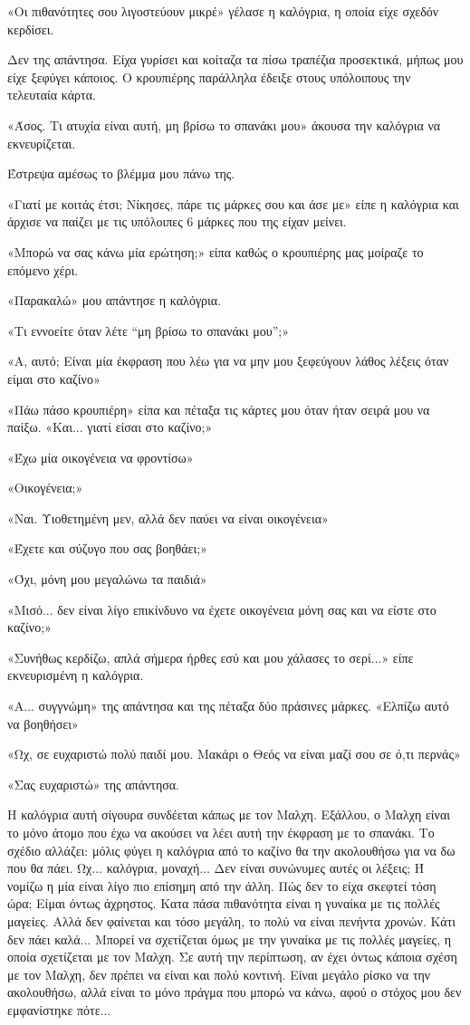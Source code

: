 \documentclass[12pt,twoside, openany]{book}
\begin{document}
«Οι πιθανότητες σου λιγοστεύουν μικρέ» γέλασε η καλόγρια, η οποία είχε σχεδόν κερδίσει.

Δεν της απάντησα. Είχα γυρίσει και κοίταζα τα πίσω τραπέζια προσεκτικά, μήπως μου είχε ξεφύγει κάποιος. Ο κρουπιέρης παράλληλα έδειξε στους υπόλοιπους την τελευταία κάρτα.

«Άσος. Τι ατυχία είναι αυτή, μη βρίσω το σπανάκι μου» άκουσα την καλόγρια να εκνευρίζεται.

Έστρεψα αμέσως το βλέμμα μου πάνω της.

«Γιατί με κοιτάς έτσι; Νίκησες, πάρε τις μάρκες σου και άσε με» είπε η καλόγρια και άρχισε να παίζει με τις υπόλοιπες 6 μάρκες που της είχαν μείνει.

«Μπορώ να σας κάνω μία ερώτηση;» είπα καθώς ο κρουπιέρης μας μοίραζε το επόμενο χέρι.

«Παρακαλώ» μου απάντησε η καλόγρια.

«Τι εννοείτε όταν λέτε “μη βρίσω το σπανάκι μου”;»

«Α, αυτό; Είναι μία έκφραση που λέω για να μην μου ξεφεύγουν λάθος λέξεις όταν είμαι στο καζίνο»

«Πάω πάσο κρουπιέρη» είπα και πέταξα τις κάρτες μου όταν ήταν σειρά μου να παίξω. «Και... γιατί είσαι στο καζίνο;»

«Έχω μία οικογένεια να φροντίσω»

«Οικογένεια;»

«Ναι. Υιοθετημένη μεν, αλλά δεν παύει να είναι οικογένεια»

«Έχετε και σύζυγο που σας βοηθάει;»

«Όχι, μόνη μου μεγαλώνω τα παιδιά»

«Μισό... δεν είναι λίγο επικίνδυνο να έχετε οικογένεια μόνη σας και να είστε στο καζίνο;»

«Συνήθως κερδίζω, απλά σήμερα ήρθες εσύ και μου χάλασες το σερί...» είπε εκνευρισμένη η καλόγρια.

«Α... συγγνώμη» της απάντησα και της πέταξα δύο πράσινες μάρκες. «Ελπίζω αυτό να βοηθήσει»

«Ωχ, σε ευχαριστώ πολύ παιδί μου. Μακάρι ο Θεός να είναι μαζί σου σε ό,τι περνάς»

«Σας ευχαριστώ» της απάντησα.

Η καλόγρια αυτή σίγουρα συνδέεται κάπως με τον Μαλχη. Εξάλλου, ο Μαλχη είναι το μόνο άτομο που έχω να ακούσει να λέει αυτή την έκφραση με το σπανάκι. Το σχέδιο αλλάζει: μόλις φύγει η καλόγρια από το καζίνο θα την ακολουθήσω για να δω που θα πάει. Ωχ... καλόγρια, μοναχή... Δεν είναι συνώνυμες αυτές οι  λέξεις; Ή νομίζω η μία είναι λίγο πιο επίσημη από την άλλη. Πώς δεν το είχα σκεφτεί τόση ώρα; Είμαι όντως άχρηστος. Κατα πάσα πιθανότητα είναι η γυναίκα με τις πολλές μαγείες. Αλλά δεν φαίνεται και τόσο μεγάλη, το πολύ να είναι πενήντα χρονών. Κάτι δεν πάει καλά... Μπορεί να σχετίζεται όμως με την γυναίκα με τις πολλές μαγείες, η οποία σχετίζεται με τον Μαλχη. Σε αυτή την περίπτωση, αν έχει όντως κάποια σχέση με τον Μαλχη, δεν πρέπει να είναι και πολύ κοντινή. Είναι μεγάλο ρίσκο να την ακολουθήσω, αλλά είναι το μόνο πράγμα που μπορώ να κάνω, αφού ο στόχος μου δεν εμφανίστηκε πότε...
\end{document}
